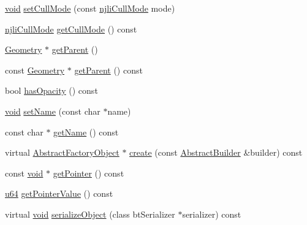 \begin{DoxyCompactItemize}
\item 
\mbox{\hyperlink{_thread_8h_af1e856da2e658414cb2456cb6f7ebc66}{void}} \mbox{\hyperlink{classnjli_1_1_material_a2ddcfec45012339d0b771c08e76985c0}{set\+Cull\+Mode}} (const \mbox{\hyperlink{namespacenjli_a2247adafa5de18bc18550918b4ed48d8}{njli\+Cull\+Mode}} mode)
\item 
\mbox{\hyperlink{namespacenjli_a2247adafa5de18bc18550918b4ed48d8}{njli\+Cull\+Mode}} \mbox{\hyperlink{classnjli_1_1_material_a0424df07cf4252ede04069be6e8bd56b}{get\+Cull\+Mode}} () const
\item 
\mbox{\hyperlink{classnjli_1_1_geometry}{Geometry}} $\ast$ \mbox{\hyperlink{classnjli_1_1_material_a45ed0723a5bff8db95b0e6e5b6b48a3e}{get\+Parent}} ()
\item 
const \mbox{\hyperlink{classnjli_1_1_geometry}{Geometry}} $\ast$ \mbox{\hyperlink{classnjli_1_1_material_a77b6c840f54e6a088248a46f43ac7f23}{get\+Parent}} () const
\item 
bool \mbox{\hyperlink{classnjli_1_1_material_a51aefb6e0eec43c7a19f70fce8e04ef8}{has\+Opacity}} () const
\item 
\mbox{\hyperlink{_thread_8h_af1e856da2e658414cb2456cb6f7ebc66}{void}} \mbox{\hyperlink{classnjli_1_1_material_a087eb5f8d9f51cc476f12f1d10a3cb95}{set\+Name}} (const char $\ast$name)
\item 
const char $\ast$ \mbox{\hyperlink{classnjli_1_1_material_ad41266885be835f3ee602311e20877a4}{get\+Name}} () const
\item 
virtual \mbox{\hyperlink{classnjli_1_1_abstract_factory_object}{Abstract\+Factory\+Object}} $\ast$ \mbox{\hyperlink{classnjli_1_1_material_a83a8876ae63b92804004cf3febe76573}{create}} (const \mbox{\hyperlink{classnjli_1_1_abstract_builder}{Abstract\+Builder}} \&builder) const
\item 
const \mbox{\hyperlink{_thread_8h_af1e856da2e658414cb2456cb6f7ebc66}{void}} $\ast$ \mbox{\hyperlink{classnjli_1_1_material_ac4ca71716ed832be357f15f8262c8448}{get\+Pointer}} () const
\item 
\mbox{\hyperlink{_util_8h_ad758b7a5c3f18ed79d2fcd23d9f16357}{u64}} \mbox{\hyperlink{classnjli_1_1_material_a4ffddf141a426a5a07d0ac19f1913811}{get\+Pointer\+Value}} () const
\item 
virtual \mbox{\hyperlink{_thread_8h_af1e856da2e658414cb2456cb6f7ebc66}{void}} \mbox{\hyperlink{classnjli_1_1_material_a4fc4bcd9d1930911474210c047372fc0}{serialize\+Object}} (class bt\+Serializer $\ast$serializer) const
\end{DoxyCompactItemize}
